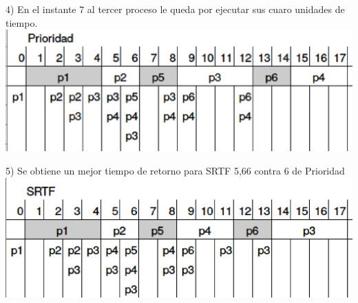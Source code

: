 \documentclass[a4paper]{article}
\begin{document}
4) En el instante 7 al tercer proceso le queda por ejecutar sus cuaro
unidades de tiempo.\\
\includegraphics[scale=0.5]{Ejercicio-4.eps}

5) Se obtiene un mejor tiempo de retorno para SRTF 5,66 contra 6 de
Prioridad\\
\includegraphics[scale=0.5]{Ejercicio-5.eps}
\end{document}
